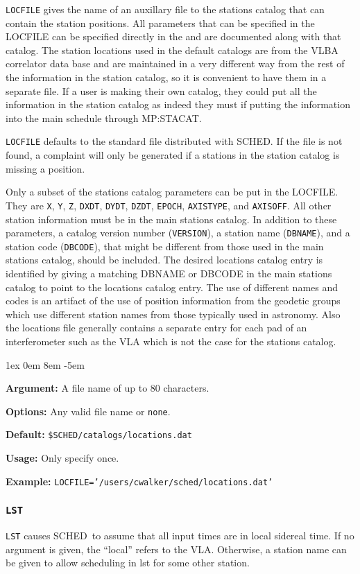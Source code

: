 \documentclass{report}
\newcommand{\sched}{{\sc SCHED}}
\newcommand{\schedb}{{\sc SCHED~}}
\newcommand{\rcwbox}[5]{
  \begin{list}{}{\parsep 1ex  \itemsep 0em
                 \leftmargin 8em  \itemindent -5em }
    \item {\bf Argument:} #1
    \item {\bf Options:}  #2
    \item {\bf Default:}  #3
    \item {\bf Usage:}    #4
    \item {\bf Example:}  #5
  \end{list}
}
\begin{document}
{\tt LOCFILE} gives the name of an auxillary file to the stations
catalog that can contain the station positions.  All parameters that
can be specified in the LOCFILE can be specified directly in the
 and are documented along with
that catalog.  The station locations used in the default catalogs are
from the VLBA correlator data base and are maintained in a very
different way from the rest of the information in the station
catalog, so it is convenient to have them in a separate file.  If
a user is making their own catalog, they could put all the
information in the station catalog as indeed they must if putting
the information into the main schedule through 
{MP:STACAT}.

{\tt LOCFILE} defaults to the standard file distributed with
\sched.  If the file is not found, a complaint will only be
generated if a stations in the station catalog is missing
a position.

Only a subset of the stations catalog parameters can be put in the
LOCFILE.  They are {\tt X}, {\tt Y}, {\tt Z}, {\tt DXDT}, {\tt DYDT},
{\tt DZDT}, {\tt EPOCH}, {\tt AXISTYPE}, and {\tt AXISOFF}.  All other
station information must be in the main stations catalog.  In addition
to these parameters, a catalog version number ({\tt VERSION}), a
station name ({\tt DBNAME}), and a station code ({\tt DBCODE}), that
might be different from those used in the main stations catalog,
should be included.  The desired locations catalog entry is identified
by giving a matching DBNAME or DBCODE in the main stations catalog to
point to the locations catalog entry.  The use of different names and
codes is an artifact of the use of position information from the
geodetic groups which use different station names from those typically
used in astronomy.  Also the locations file generally contains a
separate entry for each pad of an interferometer such as the VLA which
is not the case for the stations catalog.

\rcwbox
{A file name of up to 80 characters.}
{Any valid file name or {\tt none}.}
{{\tt \$SCHED/catalogs/locations.dat}}
{Only specify once.}
{{\tt LOCFILE='/users/cwalker/sched/locations.dat'}}

\subsubsection{\label{MP:LST}{\tt LST}}

{\tt LST} causes \schedb to assume that all input times
are in local sidereal time. If no argument is given, the ``local''
refers to the VLA. Otherwise, a station name can be given to allow
scheduling in lst for some other station.
\end{document}
